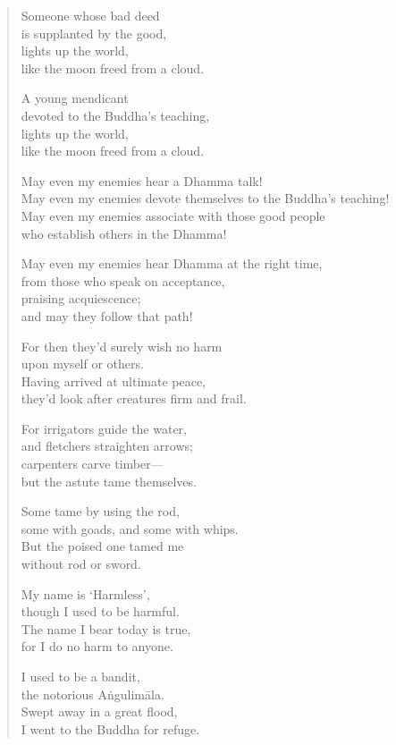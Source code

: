 \documentclass[12pt,openany]{book}%
\begin{document}
\begin{verse}
Someone whose bad deed \\
is supplanted by the good, \\
lights up the world, \\
like the moon freed from a cloud. 

A young mendicant \\
devoted to the Buddha’s teaching, \\
lights up the world, \\
like the moon freed from a cloud. 

May even my enemies hear a Dhamma talk! \\
May even my enemies devote themselves to the Buddha’s teaching! \\
May even my enemies associate with those good people \\
who establish others in the Dhamma! 

May even my enemies hear Dhamma at the right time, \\
from those who speak on acceptance, \\
praising acquiescence; \\
and may they follow that path! 

For then they’d surely wish no harm \\
upon myself or others. \\
Having arrived at ultimate peace, \\
they’d look after creatures firm and frail. 

For irrigators guide the water, \\
and fletchers straighten arrows; \\
carpenters carve timber—\\
but the astute tame themselves. 

Some tame by using the rod, \\
some with goads, and some with whips. \\
But the poised one tamed me \\
without rod or sword. 

My name is ‘Harmless’, \\
though I used to be harmful. \\
The name I bear today is true, \\
for I do no harm to anyone. 

I used to be a bandit, \\
the notorious \textsanskrit{Aṅgulimāla}. \\
Swept away in a great flood, \\
I went to the Buddha for refuge. 


\end{verse}
\end{document}
